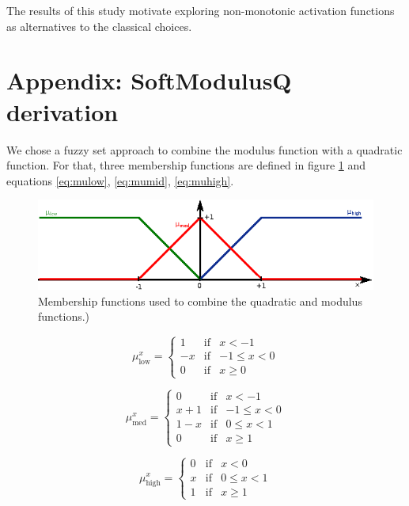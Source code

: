 The results of this study motivate exploring non-monotonic activation functions as alternatives to the classical choices.



\section*{Appendix: SoftModulusQ derivation}
We chose a fuzzy set approach to combine the modulus function with a quadratic function. For that, three membership functions are defined in figure \ref{fig:fuzzy} and equations \ref{eq:mulow}, \ref{eq:mumid}, \ref{eq:muhigh}. 
\begin{figure}[h!]
	\centering
	\includegraphics[width=0.7\linewidth]{modulus/images/fuzzy}
	\caption{Membership functions used to combine the quadratic and modulus functions.)}
	\label{fig:fuzzy}
\end{figure}

\begin{equation}
	\label{eq:mulow}
	\mu^x_{\text{low}}= \left\{ \begin{array}{lcc}
		1 &   \text{if}  & x < -1 \\
		-x & \text{if}  & -1 \leq x < 0 \\
		0 &  \text{if} & x \geq 0 
		\end{array}
		\right.
\end{equation}

\begin{equation}
	\label{eq:mumid}
	\mu^x_{\text{med}}= \left\{ \begin{array}{lcc}
		0 &   \text{if}  & x < -1 \\
		x+1 & \text{if}  & -1 \leq x < 0 \\
		1-x & \text{if}  & 0 \leq x < 1 \\
		0 &  \text{if} & x \geq 1
		\end{array}
		\right.
\end{equation}

\begin{equation}
	\label{eq:muhigh}
	\mu^x_{\text{high}}= \left\{ \begin{array}{lcc}
	0 &   \text{if}  & x < 0 \\
	x & \text{if}  & 0 \leq x < 1 \\
	1 &  \text{if} & x \geq 1 
	\end{array}
	\right.
\end{equation}

